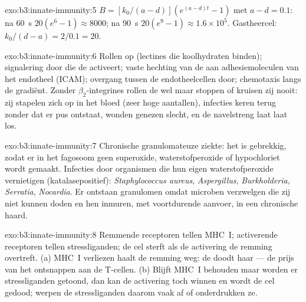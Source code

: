 \begin{solution}{exo:b3:innate-immunity:5}
$B = [k_{0}/(a-d)](e^{(a-d)t} - 1)$ met $a - d = 0.1$: na \qty{60}{s}
$20(e^{6} - 1) \approx 8000$; na \qty{90}{s} $20(e^{9} - 1) \approx
1.6\times 10^{5}$. Gastheercel: $k_{0}/(d - a) = 2/0.1 = 20$.
\end{solution}

\begin{solution}{exo:b3:innate-immunity:6}
Rollen op  (lectines die koolhydraten binden); signalering
door  die de  activeert; vaste hechting van de
 aan adhesiemoleculen van het endotheel (ICAM); overgang
tussen de endotheelcellen door; chemotaxis langs de gradiënt. Zonder
$\beta_{2}$-integrines rollen de  wel maar stoppen of
kruisen zij nooit: zij stapelen zich op in het bloed (zeer hoge
aantallen), infecties keren terug zonder dat er pus ontstaat, wonden
genezen slecht, en de navelstreng laat laat los.
\end{solution}

\begin{solution}{exo:b3:innate-immunity:7}
Chronische granulomateuze ziekte: het  is gebrekkig, zodat
er in het fagosoom geen superoxide, waterstofperoxide of hypochloriet
wordt gemaakt. Infecties door organismen die hun eigen
waterstofperoxide vernietigen (katalasepositief): \emph{Staphylococcus
aureus}, \emph{Aspergillus}, \emph{Burkholderia}, \emph{Serratia},
\emph{Nocardia}. Er ontstaan granulomen omdat  microben
verzwelgen die zij niet kunnen doden en hen inmuren, met voortdurende
aanvoer, in een chronische haard.
\end{solution}

\begin{solution}{exo:b3:innate-immunity:8}
Remmende receptoren tellen MHC~I; activerende receptoren tellen
stressliganden; de cel sterft als de activering de remming overtreft.
(a) MHC~I verliezen haalt de remming weg: de  doodt
haar --- de prijs van het ontsnappen aan de T-cellen. (b) Blijft MHC~I
behouden maar worden er stressliganden getoond, dan kan de activering
toch winnen en wordt de cel gedood;  werpen de stressliganden
daarom vaak af of onderdrukken ze.
\end{solution}

